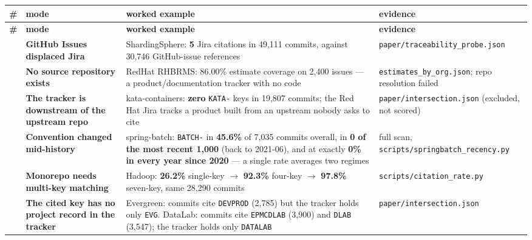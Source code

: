 \documentclass[11pt,a4paper]{article}
\begin{document}
\begingroup\footnotesize\setlength{\tabcolsep}{3pt}
\begin{longtable}{>{\raggedright\arraybackslash}p{}>{\raggedright\arraybackslash}p{}>{\raggedright\arraybackslash}p{}>{\raggedright\arraybackslash}p{}}
\toprule
\textbf{\#} & \textbf{mode} & \textbf{worked example} & \textbf{evidence} \\
\midrule
\endfirsthead
\toprule
\textbf{\#} & \textbf{mode} & \textbf{worked example} & \textbf{evidence} \\
\midrule
\endhead
\bottomrule
\endlastfoot
1 & \textbf{GitHub Issues displaced Jira} & ShardingSphere: \textbf{5} Jira citations in 49,111 commits, against 30,746 GitHub-\allowbreak{}issue references & \texttt{paper/\allowbreak{}traceability\_\allowbreak{}probe.\allowbreak{}json} \\
2 & \textbf{No source repository exists} & RedHat RHBRMS: 86.00\% estimate coverage on 2,400 issues --- a product/\allowbreak{}documentation tracker with no code & \texttt{estimates\_\allowbreak{}by\_\allowbreak{}org.\allowbreak{}json}; repo resolution failed \\
3 & \textbf{The tracker is downstream of the upstream repo} & kata-\allowbreak{}containers: \textbf{zero} \texttt{KATA-\allowbreak{}} keys in 19,807 commits; the Red Hat Jira tracks a product built from an upstream nobody asks to cite & \texttt{paper/\allowbreak{}intersection.\allowbreak{}json} (excluded, not scored) \\
4 & \textbf{Convention changed mid-\allowbreak{}history} & spring-\allowbreak{}batch: \texttt{BATCH-\allowbreak{}} in \textbf{45.6\%} of 7,035 commits overall, in \textbf{0 of the most recent 1,000} (back to 2021-06), and at exactly \textbf{0\% in every year since 2020} --- a single rate averages two regimes & full scan, \texttt{scripts/\allowbreak{}springbatch\_\allowbreak{}recency.\allowbreak{}py} \\
5 & \textbf{Monorepo needs multi-key matching} & Hadoop: \textbf{26.2\%} single-\allowbreak{}key $\rightarrow$ \textbf{92.3\%} four-key $\rightarrow$ \textbf{97.8\%} seven-\allowbreak{}key, same 28,290 commits & \texttt{scripts/\allowbreak{}citation\_\allowbreak{}rate.\allowbreak{}py} \\
6 & \textbf{The cited key has no project record in the tracker} & Evergreen: commits cite \texttt{DEVPROD} (2,785) but the tracker holds only \texttt{EVG}. DataLab: commits cite \texttt{EPMCDLAB} (3,900) and \texttt{DLAB} (3,547); the tracker holds only \texttt{DATALAB} & \texttt{paper/\allowbreak{}intersection.\allowbreak{}json} \\
\end{longtable}
\addtocounter{table}{-1}
\endgroup
\end{document}

